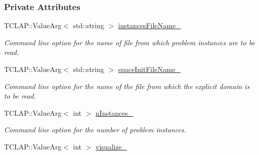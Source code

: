 \subsubsection*{Private Attributes}
\begin{DoxyCompactItemize}
\item 
T\+C\+L\+A\+P\+::\+Value\+Arg$<$ std\+::string $>$ \hyperlink{structslb_1_1core_1_1commandLine_1_1CommandLine_aae80eb58b58985870f186e80d7b16f0c}{instances\+File\+Name\+\_\+}\hypertarget{structslb_1_1core_1_1commandLine_1_1CommandLine_aae80eb58b58985870f186e80d7b16f0c}{}\label{structslb_1_1core_1_1commandLine_1_1CommandLine_aae80eb58b58985870f186e80d7b16f0c}

\begin{DoxyCompactList}\small\item\em Command line option for the name of file from which problem instances are to be read. \end{DoxyCompactList}\item 
T\+C\+L\+A\+P\+::\+Value\+Arg$<$ std\+::string $>$ \hyperlink{structslb_1_1core_1_1commandLine_1_1CommandLine_a2d5e9932ad4c70e62f1a8f5760665880}{space\+Init\+File\+Name\+\_\+}\hypertarget{structslb_1_1core_1_1commandLine_1_1CommandLine_a2d5e9932ad4c70e62f1a8f5760665880}{}\label{structslb_1_1core_1_1commandLine_1_1CommandLine_a2d5e9932ad4c70e62f1a8f5760665880}

\begin{DoxyCompactList}\small\item\em Command line option for the name of the file from which the explicit domain is to be read. \end{DoxyCompactList}\item 
T\+C\+L\+A\+P\+::\+Value\+Arg$<$ int $>$ \hyperlink{structslb_1_1core_1_1commandLine_1_1CommandLine_a45634f339b37747bcc19ce6c9e35d321}{n\+Instances\+\_\+}\hypertarget{structslb_1_1core_1_1commandLine_1_1CommandLine_a45634f339b37747bcc19ce6c9e35d321}{}\label{structslb_1_1core_1_1commandLine_1_1CommandLine_a45634f339b37747bcc19ce6c9e35d321}

\begin{DoxyCompactList}\small\item\em Command line option for the number of problem instances. \end{DoxyCompactList}\item 
T\+C\+L\+A\+P\+::\+Value\+Arg$<$ int $>$ \hyperlink{structslb_1_1core_1_1commandLine_1_1CommandLine_a4ada16371a5e3052b75b91658613f283}{visualize\+\_\+}\hypertarget{structslb_1_1core_1_1commandLine_1_1CommandLine_a4ada16371a5e3052b75b91658613f283}{}\label{structslb_1_1core_1_1commandLine_1_1CommandLine_a4ada16371a5e3052b75b91658613f283}


\end{DoxyCompactItemize}
